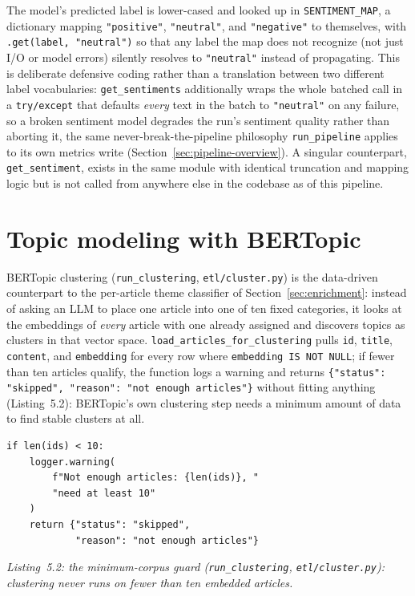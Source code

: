 The model's predicted label is lower-cased and looked up in \texttt{SENTIMENT\_MAP}, a dictionary mapping \texttt{"positive"}, \texttt{"neutral"}, and \texttt{"negative"} to themselves, with \texttt{.get(label, "neutral")} so that any label the map does not recognize (not just I/O or model errors) silently resolves to \texttt{"neutral"} instead of propagating. This is deliberate defensive coding rather than a translation between two different label vocabularies: \texttt{get\_sentiments} additionally wraps the whole batched call in a \texttt{try/except} that defaults \emph{every} text in the batch to \texttt{"neutral"} on any failure, so a broken sentiment model degrades the run's sentiment quality rather than aborting it, the same never-break-the-pipeline philosophy \texttt{run\_pipeline} applies to its own metrics write (Section~\ref{sec:pipeline-overview}). A singular counterpart, \texttt{get\_sentiment}, exists in the same module with identical truncation and mapping logic but is not called from anywhere else in the codebase as of this pipeline.

\section{Topic modeling with BERTopic}
\label{sec:bertopic}
BERTopic clustering (\texttt{run\_clustering}, \texttt{etl/\allowbreak cluster.py}) is the data-driven counterpart to the per-article theme classifier of Section~\ref{sec:enrichment}: instead of asking an LLM to place one article into one of ten fixed categories, it looks at the embeddings of \emph{every} article with one already assigned and discovers topics as clusters in that vector space. \texttt{load\_articles\_\allowbreak for\_clustering} pulls \texttt{id}, \texttt{title}, \texttt{content}, and \texttt{embedding} for every row where \texttt{embedding IS NOT NULL}; if fewer than ten articles qualify, the function logs a warning and returns \texttt{\{"status": "skipped", "reason": "not enough articles"\}} without fitting anything (Listing~5.2): BERTopic's own clustering step needs a minimum amount of data to find stable clusters at all.

\begin{verbatim}
if len(ids) < 10:
    logger.warning(
        f"Not enough articles: {len(ids)}, "
        "need at least 10"
    )
    return {"status": "skipped",
            "reason": "not enough articles"}
\end{verbatim}
\begin{center}
\textit{Listing~5.2: the minimum-corpus guard (\texttt{run\_clustering}, \texttt{etl/\allowbreak cluster.py}): clustering never runs on fewer than ten embedded articles.}
\end{center}

